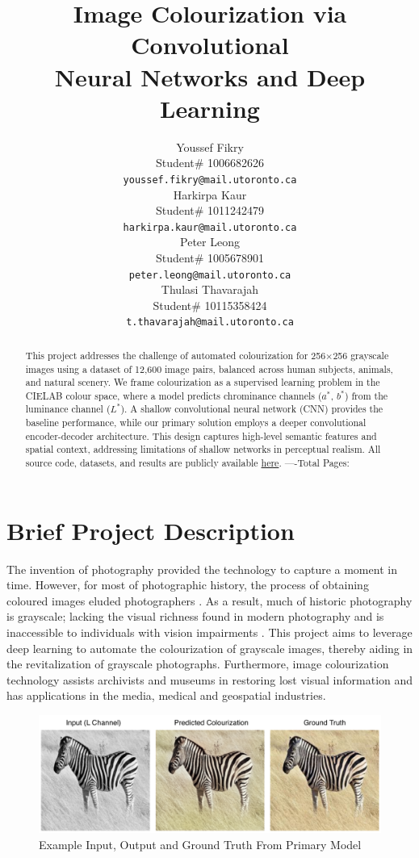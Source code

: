 \documentclass{article} %
\title{Image Colourization via Convolutional \\
Neural Networks and Deep Learning}
\author{Youssef Fikry  \\
Student\# 1006682626\\
\texttt{youssef.fikry@mail.utoronto.ca} \\
\And Harkirpa Kaur  \\
Student\# 1011242479 \\
\texttt{harkirpa.kaur@mail.utoronto.ca} \\
\AND
Peter Leong \\
Student\# 1005678901 \\
\texttt{peter.leong@mail.utoronto.ca} \\
\And
Thulasi Thavarajah \\
Student\# 10115358424 \\
\texttt{t.thavarajah@mail.utoronto.ca} \\
\AND
}
\begin{document}
\maketitle

\begin{abstract}
This project addresses the challenge of automated colourization for 256$\times$256 grayscale images using a dataset of 12,600 image pairs, balanced across human subjects, 
animals, and natural scenery. We frame colourization as a supervised learning problem in the CIELAB colour space, where a model predicts chrominance channels ($a^*$, $b^*$) 
from the luminance channel ($L^*$). A shallow convolutional neural network (CNN) provides the baseline performance, while our primary solution employs a deeper convolutional encoder-decoder architecture. This 
design captures high-level semantic features and spatial context, addressing limitations of shallow networks in perceptual realism. All source code, datasets, and results 
are publicly available \href{https://drive.google.com/drive/folders/1cV1NhlQ8UTk_CgJdwhqeRu0z5xE85ZsI?usp=sharing}{here}. 
----Total Pages: \pageref{last_page}
\end{abstract}


\section{Brief Project Description}

The invention of photography provided the technology to capture a moment in time. However, for most of photographic history, the process of obtaining coloured images eluded photographers \citep{scienceandmediamuseum2020}. As a result, much of historic photography is grayscale; lacking the visual richness found in modern photography and is inaccessible to individuals with vision impairments \citep{vogelsang2024impact}. This project aims to leverage deep learning to automate the colourization of grayscale images, thereby aiding in the revitalization of grayscale photographs. Furthermore, image colourization technology assists archivists and museums in restoring lost visual information and has applications in the media, medical and geospatial industries. 

\begin{figure}[h]            %
  \centering
  \includegraphics[width=0.99\linewidth]{Figs/final-model-example.png}
  \caption{Example Input, Output and Ground Truth From Primary Model}
  \label{fig:final-model}
\end{figure}
\end{document}

